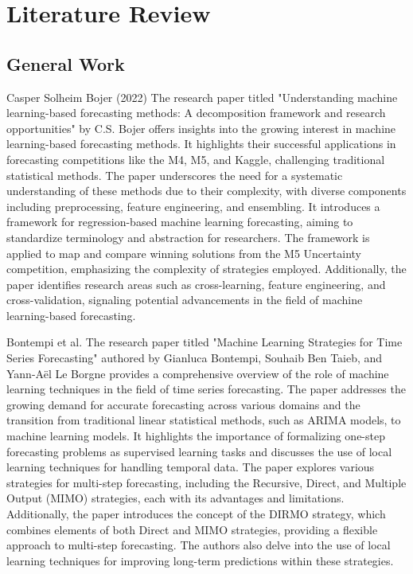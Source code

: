 % 
\section{Literature Review}

    \subsection{General Work}
        
        Casper Solheim Bojer (2022) \cite{bojer2022} The research paper titled "Understanding machine learning-based forecasting methods: A decomposition framework and research opportunities" by C.S. Bojer offers insights into the growing interest in machine learning-based forecasting methods. It highlights their successful applications in forecasting competitions like the M4, M5, and Kaggle, challenging traditional statistical methods. The paper underscores the need for a systematic understanding of these methods due to their complexity, with diverse components including preprocessing, feature engineering, and ensembling. It introduces a framework for regression-based machine learning forecasting, aiming to standardize terminology and abstraction for researchers. The framework is applied to map and compare winning solutions from the M5 Uncertainty competition, emphasizing the complexity of strategies employed. Additionally, the paper identifies research areas such as cross-learning, feature engineering, and cross-validation, signaling potential advancements in the field of machine learning-based forecasting.
        
        Bontempi et al. \cite{Bontempi2013} The research paper titled "Machine Learning Strategies for Time Series Forecasting" authored by Gianluca Bontempi, Souhaib Ben Taieb, and Yann-Aël Le Borgne provides a comprehensive overview of the role of machine learning techniques in the field of time series forecasting. The paper addresses the growing demand for accurate forecasting across various domains and the transition from traditional linear statistical methods, such as ARIMA models, to machine learning models. It highlights the importance of formalizing one-step forecasting problems as supervised learning tasks and discusses the use of local learning techniques for handling temporal data. The paper explores various strategies for multi-step forecasting, including the Recursive, Direct, and Multiple Output (MIMO) strategies, each with its advantages and limitations. Additionally, the paper introduces the concept of the DIRMO strategy, which combines elements of both Direct and MIMO strategies, providing a flexible approach to multi-step forecasting. The authors also delve into the use of local learning techniques for improving long-term predictions within these strategies.
        
